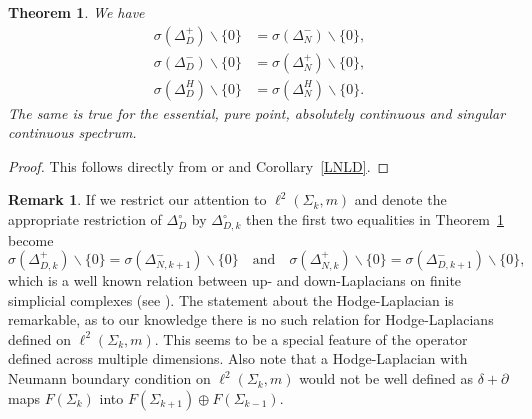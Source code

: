 \documentclass[10pt]{amsart}
\newtheorem{theorem}{Theorem}[section]
\theoremstyle{definition}
\newtheorem*{remark}{Remark}
\newcommand{\F}{{F}}
\renewcommand{\bullet}{{\circ}}
\newcommand{\eat}[1]{}
\begin{document}
\begin{theorem}\label{spectrum0}
    We have 
    \begin{align*}
        \sigma(\Delta^+_{D})\backslash\lbrace 0\rbrace &= \sigma(\Delta^-_N)\backslash\lbrace 0\rbrace,\\
        \sigma(\Delta^-_{D})\backslash\lbrace 0\rbrace &= \sigma(\Delta^+_N)\backslash\lbrace 0\rbrace,\\
        \sigma(\Delta^H_{D})\backslash\lbrace 0\rbrace &= \sigma(\Delta^H_N)\backslash\lbrace 0\rbrace.
    \end{align*}
    The same is true for the essential, pure point, absolutely continuous and singular continuous  spectrum.
\end{theorem}
\begin{proof}This follows directly 
	from \cite[Corollary~5.6.]{T} or \cite[Proposition~1.23]{FLW} and Corollary~\ref{LNLD}.
\end{proof}
\begin{remark}
	    If we restrict our attention to %
	    $\ell^2(\Sigma_k,m)$ and denote the appropriate restriction of $\Delta^\bullet_{D}$ by $\Delta^\bullet_{D,k}$ then %
	    the first two equalities in Theorem~\ref{spectrum0} become
    $$\sigma(\Delta^+_{D,k})\backslash\lbrace 0\rbrace = \sigma(\Delta^-_{N,k+1})\backslash\lbrace 0\rbrace\quad\text{and}\quad \sigma(\Delta^+_{N,k})\backslash\lbrace 0\rbrace = \sigma(\Delta^-_{D,k+1})\backslash\lbrace 0\rbrace,$$
    which is a well known relation between up- and down-Laplacians on finite simplicial complexes (see \cite{HJ}). The statement about the Hodge-Laplacian is remarkable, as to our knowledge there is no such relation for Hodge-Laplacians defined on $\ell^2(\Sigma_k,m).$ This seems to be a special feature of the operator defined across multiple dimensions. Also note that a Hodge-Laplacian with Neumann boundary condition on $\ell^2(\Sigma_k,m)$ would not be well defined as $\delta+\partial$ maps $\F(\Sigma_k)$ into $\F(\Sigma_{k+1})\oplus \F(\Sigma_{k-1}).$
\end{remark}

\eat{\begin{remark}
    After writing up this paper we got aware of the reference \cite[Corollary~5.6.]{T} that shows a stronger result than the one given in Theorem \ref{TT*} namely that the operators involved are unitarily equivalent when restricted to the orthogonal complement of their kernel. Applying this to the setting of Theorem \ref{spectrum0} yields that also the spectral types of the nonzero spectra, i.e. pure point, absolutely continuous and singular continuous spectra, coincide.
\end{remark}}
\end{document}
